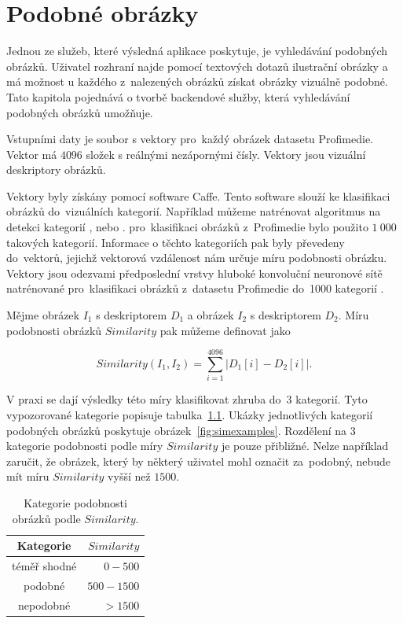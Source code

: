 \chapter{Podobné obrázky}
\label{chap:similar}


Jednou ze služeb, které výsledná aplikace poskytuje, je vyhledávání podobných obrázků. Uživatel rozhraní najde pomocí textových dotazů ilustrační obrázky a má možnost u každého z~nalezených obrázků získat obrázky vizuálně podobné. Tato kapitola pojednává o tvorbě backendové služby, která vyhledávání podobných obrázků umožňuje.

Vstupními daty je soubor s vektory pro~každý obrázek datasetu Profimedie. Vektor má $4 096$ složek s reálnými nezápornými čísly. Vektory jsou vizuální deskriptory obrázků.

Vektory byly získány pomocí software Caffe\cite{caffe}. Tento software slouží ke klasifikaci obrázků do~vizuálních kategorií. Například můžeme natrénovat algoritmus na detekci kategorií , nebo . pro~klasifikaci obrázků z~Profimedie bylo použito $1\ 000$ takových kategorií. Informace o těchto kategoriích pak byly převedeny do~vektorů, jejichž vektorová vzdálenost nám určuje míru podobnosti obrázku. Vektory jsou odezvami předposlední vrstvy hluboké konvoluční neuronové sítě natrénované pro~klasifikaci obrázků z~datasetu Profimedie do~1000 kategorií \cite{mufin}.

Mějme obrázek $I_1$ s deskriptorem $D_1$ a obrázek $I_2$ s deskriptorem $D_2$. Míru podobnosti obrázků $Similarity$ pak můžeme definovat jako

\begin{equation}
  Similarity(I_1, I_2) = \sum_{i=1}^{4096} |D_1[i]-D_2[i]|.
\end{equation}

V praxi se dají výsledky této míry klasifikovat zhruba do~3 kategorií. Tyto vypozorované kategorie popisuje tabulka~\ref{fig:simtypes}. Ukázky jednotlivých kategorií podobných obrázků poskytuje obrázek~\ref{fig:simexamples}. Rozdělení na 3 kategorie podobnosti podle míry $Similarity$ je pouze přibližné. Nelze například zaručit, že obrázek, který by některý uživatel mohl označit za~podobný, nebude mít míru $Similarity$ vyšší než $1 500$.

\begin{table}[h]
\label{fig:simtypes}
\centering
\begin{tabular}{ | c | r |}
  \hline
     Kategorie & $Similarity$\\
  \hline
  \hline
    téměř shodné & $0 - 500$ \\
  \hline
    podobné & $500 - 1500$ \\
  \hline
    nepodobné & $> 1500$ \\
\hline
\end{tabular}

  \caption{Kategorie podobnosti obrázků podle $Similarity$.}
\end{table}

